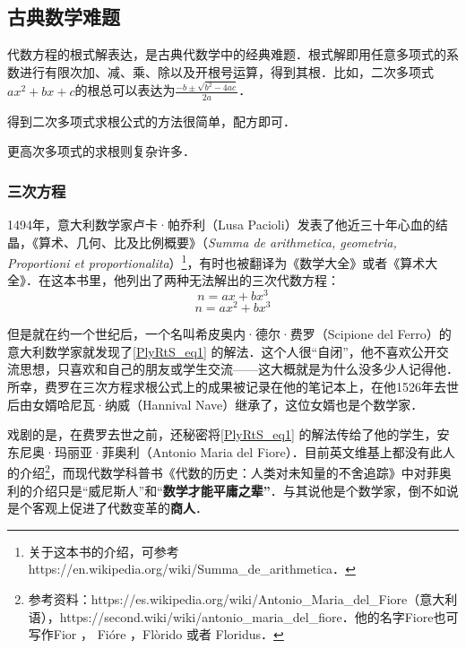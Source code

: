 


\subsection{古典数学难题}

代数方程的根式解表达，是古典代数学中的经典难题．根式解即用任意多项式的系数进行有限次加、减、乘、除以及开根号运算，得到其根．比如，二次多项式$ax^2+bx+c$的根总可以表达为$\frac{-b\pm\sqrt{b^2-4ac}}{2a}$．

得到二次多项式求根公式的方法很简单，配方即可．

更高次多项式的求根则复杂许多．

\subsubsection{三次方程}

1494年，意大利数学家卢卡·帕乔利（Lusa Pacioli）发表了他近三十年心血的结晶，《算术、几何、比及比例概要》（\textsl{Summa de arithmetica, geometria, Proportioni et proportionalita}）\footnote{关于这本书的介绍，可参考https://en.wikipedia.org/wiki/Summa_de_arithmetica．}，有时也被翻译为《数学大全》或者《算术大全》．在这本书里，他列出了两种无法解出的三次代数方程：
\begin{equation}\label{PlyRtS_eq1}
n=ax+bx^3
\end{equation}
\begin{equation}\label{PlyRtS_eq2}
n=ax^2+bx^3
\end{equation}

但是就在约一个世纪后，一个名叫希皮奥内·德尔·费罗（Scipione del Ferro）的意大利数学家就发现了\autoref{PlyRtS_eq1} 的解法．这个人很“自闭”，他不喜欢公开交流思想，只喜欢和自己的朋友或学生交流——这大概就是为什么没多少人记得他．所幸，费罗在三次方程求根公式上的成果被记录在他的笔记本上，在他1526年去世后由女婿哈尼瓦·纳威（Hannival Nave）继承了，这位女婿也是个数学家．

戏剧的是，在费罗去世之前，还秘密将\autoref{PlyRtS_eq1} 的解法传给了他的学生，安东尼奥·玛丽亚·菲奥利（Antonio Maria del Fiore）．目前英文维基上都没有此人的介绍\footnote{参考资料：https://es.wikipedia.org/wiki/Antonio_Maria_del_Fiore（意大利语），https://second.wiki/wiki/antonio_maria_del_fiore．他的名字Fiore也可写作Fior ， Fióre ，Flòrido 或者 Floridus．}，而现代数学科普书《代数的历史：人类对未知量的不舍追踪》中对菲奥利的介绍只是“威尼斯人”和“\textbf{数学才能平庸之辈”}．与其说他是个数学家，倒不如说是个客观上促进了代数变革的\textbf{商人}．

